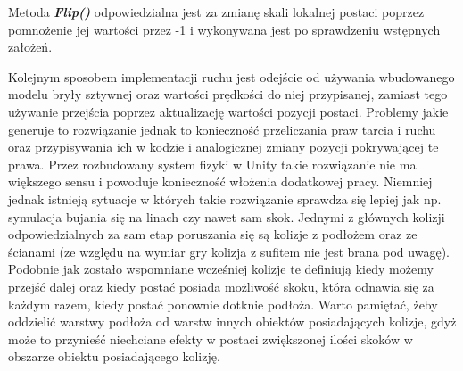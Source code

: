 \documentclass[oneside,polski,logo]{amuthesis}
\begin{document}
Metoda \textbf{\textit{Flip()}} odpowiedzialna jest za zmianę skali lokalnej postaci poprzez pomnożenie jej wartości przez -1 i wykonywana jest po sprawdzeniu wstępnych założeń.

Kolejnym sposobem implementacji ruchu jest odejście od używania wbudowanego modelu bryły sztywnej oraz wartości prędkości do niej przypisanej, zamiast tego używanie przejścia poprzez aktualizację wartości pozycji postaci. Problemy jakie generuje to rozwiązanie jednak to konieczność przeliczania praw tarcia i ruchu oraz przypisywania ich w kodzie i analogicznej zmiany pozycji pokrywającej te prawa. Przez rozbudowany system fizyki w Unity takie rozwiązanie nie ma większego sensu i powoduje konieczność włożenia dodatkowej pracy. Niemniej jednak istnieją sytuacje w których takie rozwiązanie sprawdza się lepiej jak np. symulacja bujania się na linach czy nawet sam skok.
Jednymi z głównych kolizji odpowiedzialnych za sam etap poruszania się są kolizje z podłożem oraz ze ścianami (ze względu na wymiar gry kolizja z sufitem nie jest brana pod uwagę). Podobnie jak zostało wspomniane wcześniej kolizje te definiują kiedy możemy przejść dalej oraz kiedy postać posiada możliwość skoku, która odnawia się za każdym razem, kiedy postać ponownie dotknie podłoża. Warto pamiętać, żeby oddzielić warstwy podłoża od warstw innych obiektów posiadających kolizje, gdyż może to przynieść niechciane efekty w postaci zwiększonej ilości skoków w obszarze obiektu posiadającego kolizję.
\end{document}
